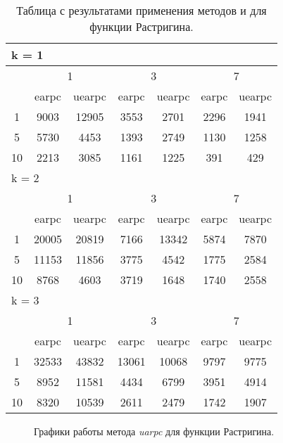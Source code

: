 \begin{table}
  \centering
  \begin{tabular}{|*7{c|}}
    \hline
    \multicolumn{7}{|l|}{k = 1} \\
    \hline
    \multirow{2}{*}{\diagbox{$\mu$}{$\lambda$}} & \multicolumn{2}{c|}{1} & \multicolumn{2}{c|}{3} & \multicolumn{2}{c|}{7} \\
    \cline{2-7}
    & earpc & uearpc & earpc & uearpc & earpc & uearpc \\
    \hline
    1 & 9003 & 12905 & 3553& 2701 & 2296 & 1941 \\
    \hline
    5 & 5730 & 4453 & 1393 & 2749 & 1130 & 1258 \\
    \hline
    10 & 2213 & 3085 & 1161 & 1225 & 391 & 429 \\
    \hline
    \multicolumn{7}{|l|}{k = 2} \\
    \hline
    \multirow{2}{*}{\diagbox{$\mu$}{$\lambda$}} & \multicolumn{2}{c|}{1} & \multicolumn{2}{c|}{3} & \multicolumn{2}{c|}{7} \\
    \cline{2-7}
    & earpc & uearpc & earpc & uearpc & earpc & uearpc \\
    \hline
    1 & 20005 & 20819 & 7166 & 13342 & 5874 & 7870 \\
    \hline
    5 & 11153 & 11856 & 3775 & 4542 & 1775 & 2584 \\
    \hline
    10 & 8768 & 4603 & 3719 & 1648 & 1740 & 2558 \\
    \hline
    \multicolumn{7}{|l|}{k = 3} \\
    \hline
    \multirow{2}{*}{\diagbox{$\mu$}{$\lambda$}} & \multicolumn{2}{c|}{1} & \multicolumn{2}{c|}{3} & \multicolumn{2}{c|}{7} \\
    \cline{2-7}
    & earpc & uearpc & earpc & uearpc & earpc & uearpc \\
    \hline
    1 & 32533 & 43832 & 13061 & 10068 & 9797 & 9775 \\
    \hline
    5 & 8952 & 11581 & 4434 & 6799 & 3951 & 4914 \\
    \hline
    10 & 8320 & 10539 & 2611 & 2479 & 1742 & 1907 \\
    \hline
  \end{tabular}
  \captionsetup{justification=centering}
  \caption{Таблица с результатами применения методов  и  для функции Растригина.}
  \label{earpc_rastrigin_results}
\end{table}

\begin{figure}
  \centering
  \caption{ Графики работы метода \textit{uarpc} для функции Растригина.}
  \label{earpc_rastrigin_plot}
\end{figure}

